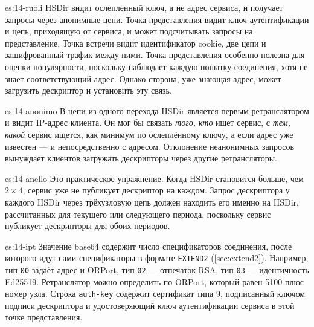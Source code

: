 \begin{soluzione}{es:14-ruoli}
HSDir видит ослеплённый ключ, а не адрес сервиса, и получает запросы через анонимные цепи. Точка представления видит ключ аутентификации и цепь, приходящую от сервиса, и может подсчитывать запросы на представление. Точка встречи видит идентификатор cookie, две цепи и зашифрованный трафик между ними. Точка представления особенно полезна для оценки популярности, поскольку наблюдает каждую попытку соединения, хотя не знает соответствующий адрес. Однако сторона, уже знающая адрес, может загрузить дескриптор и установить эту связь.
\end{soluzione}

\begin{soluzione}{es:14-anonimo}
В цепи из одного перехода HSDir является первым ретранслятором и видит IP-адрес клиента. Он мог бы связать \emph{того, кто} ищет сервис, с \emph{тем, какой} сервис ищется, как минимум по ослеплённому ключу, а если адрес уже известен — и непосредственно с адресом. Отклонение неанонимных запросов вынуждает клиентов загружать дескрипторы через другие ретрансляторы.
\end{soluzione}

\begin{soluzione}{es:14-anello}
Это практическое упражнение. Когда HSDir становится больше, чем $2 \times 4$, сервис уже не публикует дескриптор на каждом. Запрос дескриптора у каждого HSDir через трёхузловую цепь должен находить его именно на HSDir, рассчитанных для текущего или следующего периода, поскольку сервис публикует дескрипторы для обоих периодов.
\end{soluzione}

\begin{soluzione}{es:14-ipt}
Значение base64 содержит число спецификаторов соединения, после которого идут сами спецификаторы в формате \texttt{EXTEND2} (\cref{sec:extend2}). Например, тип \texttt{00} задаёт адрес и ORPort, тип \texttt{02} — отпечаток RSA, тип \texttt{03} — идентичность Ed25519. Ретранслятор можно определить по ORPort, который равен 5100 плюс номер узла. Строка \texttt{auth-key} содержит сертификат типа 9, подписанный ключом подписи дескриптора и удостоверяющий ключ аутентификации сервиса в этой точке представления.
\end{soluzione}
